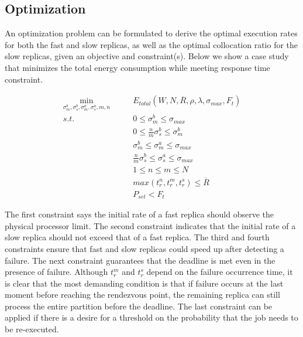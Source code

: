 \subsection{Optimization}
\label{sec:crash_opt}
An optimization problem can be formulated to derive the optimal execution rates for both the fast and slow replicas, as well as the optimal collocation ratio for the slow replicas, given an objective and constraint(s). Below we show a case study that minimizes the total energy consumption while meeting response time constraint. 

\begin{equation}
\begin{alignedat}{2}
\min_{\sigma_m^b,\sigma_s^b,\sigma_m^a,\sigma_s^a, m, n} \qquad  & E_{total}(W,N,\overline{R},\rho,\lambda,\sigma_{max},F_t) \\
s.t.  \qquad          & 0 \leq \sigma_m^b \leq \sigma_{max} \\
                      & 0 \leq \frac{n}{m}\sigma_s^b \leq \sigma_m^b \\
                     & \sigma_m^b \leq \sigma_m^a \leq \sigma_{max} \\
                     & \frac{n}{m}\sigma_s^b \leq \sigma_s^a \leq \sigma_{max} \\
                     & 1 \leq n \leq m \leq N \\
                      & max(t_r^n, t_r^m, t_r^s) \leq \overline{R} \\
                      & P_{set} < F_t
\end{alignedat}
\end{equation}

The first constraint says the initial rate of a fast replica should observe the physical processor limit. The second constraint indicates that the initial rate of a slow replica should not exceed that of a fast replica. The third and fourth constraints ensure that fast and slow replicas could speed up after detecting a failure. The next constraint guarantees that the deadline is met even in the presence of failure. Although $t_r^m$ and $t_r^s$ depend on the failure occurrence time, it is clear that the most demanding condition is that if failure occurs at the last moment before reaching the rendezvous point, the remaining replica can still process the entire partition before the deadline. The last constraint can be applied if there is a desire for a threshold on the probability that the job needs to be re-executed.